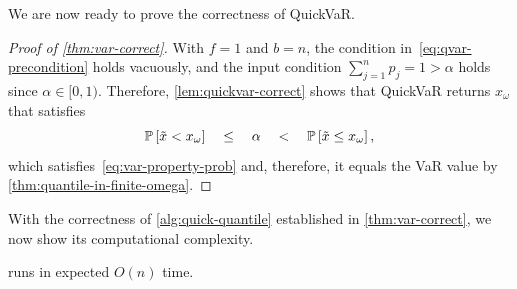 We are now ready to prove the correctness of QuickVaR.
\begin{proof}[Proof of \cref{thm:var-correct}]
With $f = 1$ and $b = n$, the condition in~\eqref{eq:qvar-precondition} holds vacuously, and the input condition $\sum_{j=1}^n p_j = 1 > \alpha$ holds since $\alpha\in [0,1)$. Therefore, \cref{lem:quickvar-correct} shows that QuickVaR returns $x_{\omega}$ that satisfies
  \[
  \P{\tilde{x} < x_{\omega}}
  \quad \le \quad
  \alpha 
  \quad < \quad \P{\tilde{x} \le x_{\omega}}, 
\]
which satisfies~\eqref{eq:var-property-prob} and, therefore, it equals the VaR value by 
  \cref{thm:quantile-in-finite-omega}. 
\end{proof}

With the correctness of \cref{alg:quick-quantile} established in \cref{thm:var-correct}, we now show its computational complexity. 
\begin{theorem} \label{prop:time-complexity}
 runs in expected $O(n)$ time.
\end{theorem}
